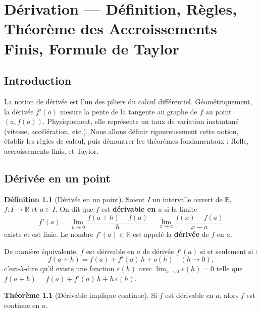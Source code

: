 \documentclass[12pt,a4paper,openany]{book}
\theoremstyle{definition}
\newtheorem{definition}{Définition}[chapter]
\newtheorem{theoreme}{Théorème}[chapter]
\newcommand{\R}{\mathbb{R}}
\begin{document}
\chapter{Dérivation --- Définition, Règles, Théorème des Accroissements Finis, Formule de Taylor}\label{chap:derivation}

\section*{Introduction}

La notion de dérivée est l'un des piliers du calcul différentiel. Géométriquement, la dérivée $f'(a)$ mesure la pente de la tangente au graphe de $f$ au point $(a, f(a))$. Physiquement, elle représente un taux de variation instantané (vitesse, accélération, etc.). Nous allons définir rigoureusement cette notion, établir les règles de calcul, puis démontrer les théorèmes fondamentaux : Rolle, accroissements finis, et Taylor.

\section{Dérivée en un point}\label{sec:derivee-point}

\begin{definition}[Dérivée en un point]\label{def:derivee}
Soient $I$ un intervalle ouvert de $\R$, $f \colon I \to \R$ et $a \in I$. On dit que $f$ est \textbf{dérivable en $a$} si la limite
\[
  f'(a) = \lim_{h \to 0} \frac{f(a + h) - f(a)}{h}
  = \lim_{x \to a} \frac{f(x) - f(a)}{x - a}
\]
existe et est finie. Le nombre $f'(a) \in \R$ est appelé la \textbf{dérivée} de $f$ en $a$.

De manière équivalente, $f$ est dérivable en $a$ de dérivée $f'(a)$ si et seulement si :
\[
  f(a + h) = f(a) + f'(a)\,h + o(h) \quad (h \to 0),
\]
c'est-à-dire qu'il existe une fonction $\varepsilon(h)$ avec $\lim_{h \to 0} \varepsilon(h) = 0$ telle que $f(a+h) = f(a) + f'(a)\,h + h\,\varepsilon(h)$.
\end{definition}

\begin{theoreme}[Dérivable implique continue]\label{thm:derivable-continue}
Si $f$ est dérivable en $a$, alors $f$ est continue en $a$.
\end{theoreme}
\end{document}
